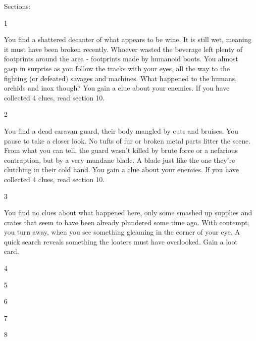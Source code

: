 \documentclass[fontsize=11pt]{scrartcl}
\begin{document}
	\begin{multicols}{3}
	  \begin{center}
	    \textcolor{Sepia}{\LARGE{Sections:}}
		\end{center}
		\begin{center}
		  \large{\textcolor{Sepia}{1}}
		\end{center}
		\footnotesize{You find a shattered decanter of what appears to be wine. It is still wet, meaning it must have been broken recently. Whoever wasted the beverage left plenty of footprints around the area - footprints made by humanoid boots. You almost gasp in surprise as you follow the tracks with your eyes, all the way to the fighting (or defeated) savages and machines. What happened to the humans, orchids and inox though? You gain a clue about your enemies. If you have collected 4 clues, read section 10.}
		\begin{center}
		  \large{\textcolor{Sepia}{2}}
		\end{center}
		\footnotesize{You find a dead caravan guard, their body mangled by cuts and bruises. You pause to take a closer look. No tufts of fur or broken metal parts litter the scene. From what you can tell, the guard wasn’t killed by brute force or a nefarious contraption, but by a very mundane blade. A blade just like the one they’re clutching in their cold hand. You gain a clue about your enemies. If you have collected 4 clues, read section 10.}
		\begin{center}
		  \large{\textcolor{Sepia}{3}}
		\end{center}
		\footnotesize{You find no clues about what happened here, only some smashed up supplies and crates that seem to have been already plundered some time ago. With contempt, you turn away, when you see something gleaming in the corner of your eye. A quick search reveals something the looters must have overlooked. Gain a loot card.}
		\begin{center}
		  \large{\textcolor{Sepia}{4}}
		\end{center}
		\begin{center}
		  \large{\textcolor{Sepia}{5}}
		\end{center}
		\begin{center}
		  \large{\textcolor{Sepia}{6}}
		\end{center}
		\begin{center}
		  \large{\textcolor{Sepia}{7}}
		\end{center}
		\begin{center}
		  \large{\textcolor{Sepia}{8}}

\end{center}
\end{multicols}
\end{document}
